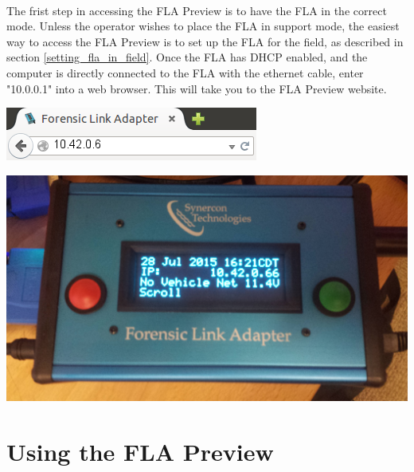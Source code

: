 \documentclass[11pt, oneside]{book}
\begin{document}
\paragraph{  }
The frist step in accessing the FLA Preview is to have the FLA in the correct mode. Unless the operator wishes to place the FLA in support mode, the easiest way to access the FLA Preview is to set up the FLA for the field, as described in section \ref{setting_fla_in_field}. Once the FLA has DHCP enabled, and the computer is directly connected to the FLA with the ethernet cable, enter "10.0.0.1" into a web browser. This will take you to the FLA Preview website.
\\[\baselineskip]
\noindent\begin{minipage}{0.45\textwidth}%
	\includegraphics[width=\linewidth]{../media/fla_preview_screenshots/url_correct_dhcp} 
\end{minipage}%
\hfill%
\begin{minipage}{0.45\textwidth} 
	\includegraphics[width=\linewidth]{../media/fla_screens/title_screen_no_veh_net_dhcp} 
\end{minipage}
\section{Using the FLA Preview}
\end{document}

